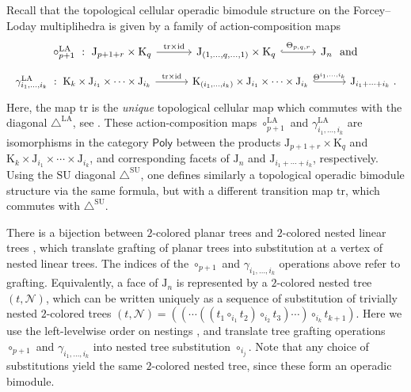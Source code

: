\documentclass{amsart}
\theoremstyle{definition}
\newcommand{\K}{\mathrm{K}} %
\newcommand{\J}{\mathrm{J}} %
\newcommand{\SU}{\mathrm{SU}}
\newcommand{\LA}{\mathrm{LA}}
\newcommand{\SUD}{\triangle^{\mathrm{SU}}}
\newcommand{\LAD}{\triangle^{\mathrm{LA}}}
\newcommand{\PolySub}{\mathsf{Poly}}
\newcommand{\tr}{\mathrm{tr}}
\newcommand{\id}{\mathrm{id}}
\begin{document}
Recall that the topological cellular operadic bimodule structure on the Forcey--Loday multiplihedra is given by a family of action-composition maps \cite[Def. 2.13]{LaplanteAnfossiMazuir}
\[
\vcenter{\hbox{
\begin{tikzcd}[column sep = 16pt]
\circ_{p+1}^\LA\ : \ \J_{p+1+r}\times \K_q
\arrow[rr,  "\tr\times \id"]
& & 
\J_{(1,\ldots,q,\ldots,1)}\times \K_q 
\arrow[rr,hookrightarrow, "\Theta_{p,q,r}"]
&  &
\J_{n}\ \ \text{and}
\end{tikzcd}
}}
\]
\[
\vcenter{\hbox{
\begin{tikzcd}[column sep = 16pt]
\gamma_{i_1,\ldots,i_k}^\LA \ : \ \K_{k}\times \J_{i_1} \times \cdots \times \J_{i_k}
\arrow[rr,  "\tr\times \id"]
& &
\K_{(i_1,\ldots,i_k)} \times \J_{i_1} \times \cdots \times \J_{i_k} 
\arrow[rr,hookrightarrow, "\Theta^{i_1, \ldots , i_k}"]
& &
\J_{i_1+\cdots + i_k}\ .
\end{tikzcd}
}}
\]
Here, the map $\tr$ is the \emph{unique} topological cellular map which commutes with the diagonal $\LAD$, see \cite[Prop. 7]{MasudaThomasTonksVallette}. 
These action-composition maps $\circ_{p+1}^\LA$ and $\gamma_{i_1,\ldots,i_k}^\LA$ are isomorphisms in the category $\PolySub$ \cite[Sec.~2.1]{LaplanteAnfossiMazuir} between the products $\J_{p+1+r}\times \K_q$ and $\K_{k}\times \J_{i_1} \times \cdots \times \J_{i_k}$, and corresponding facets of $\J_n$ and $\J_{i_1 + \cdots + i_k}$, respectively.
Using the $\SU$ diagonal $\SUD$, one defines similarly a topological operadic bimodule structure via the same formula, but with a different transition map $\tr$, which commutes with $\SUD$.

There is a bijection between $2$-colored planar trees and $2$-colored nested linear trees \cite[Lem.~3.4 \& Fig.~6]{LaplanteAnfossiMazuir}, which translate grafting of planar trees into substitution at a vertex of nested linear trees.
The indices of the $\circ_{p+1}$ and $\gamma_{i_1,\ldots,i_k}$ operations above refer to grafting. 
Equivalently, a face of $\J_n$ is represented by a $2$-colored nested tree $(t,\mathcal{N})$, which can be written uniquely as a sequence of substitution of trivially nested $2$-colored trees $(t,\mathcal{N})=((\cdots((t_1\circ_{i_1} t_2) \circ_{i_2} t_3) \cdots )\circ_{i_k} t_{k+1})$.
Here we use the left-levelwise order on nestings \cite[Def. 4.12]{LaplanteAnfossiMazuir}, and translate tree grafting operations $\circ_{p+1}$ and $\gamma_{i_1,\ldots,i_k}$ into nested tree substitution $\circ_{i_j}$.
Note that any choice of substitutions yield the same $2$-colored nested tree, since these form an operadic bimodule.
\end{document}
